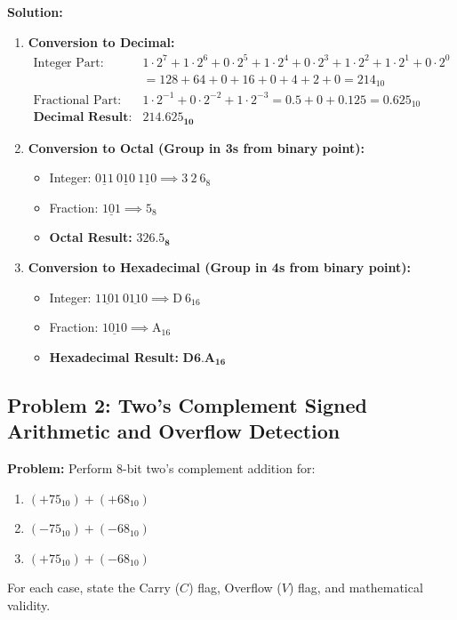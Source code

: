 \textbf{Solution:}
\begin{enumerate}[label=\bfseries\alph*.]
    \item \textbf{Conversion to Decimal:}
    \begin{align*}
    \text{Integer Part: } & 1\cdot 2^7 + 1\cdot 2^6 + 0\cdot 2^5 + 1\cdot 2^4 + 0\cdot 2^3 + 1\cdot 2^2 + 1\cdot 2^1 + 0\cdot 2^0 \\
    &= 128 + 64 + 0 + 16 + 0 + 4 + 2 + 0 = 214_{10} \\
    \text{Fractional Part: } & 1\cdot 2^{-1} + 0\cdot 2^{-2} + 1\cdot 2^{-3} = 0.5 + 0 + 0.125 = 0.625_{10} \\
    \textbf{Decimal Result: } & \mathbf{214.625_{10}}
    \end{align*}
    \item \textbf{Conversion to Octal (Group in 3s from binary point):}
    \begin{itemize}
        \item Integer: $\underline{011} \ \underline{010} \ \underline{110} \implies 3 \ 2 \ 6_8$
        \item Fraction: $\underline{101} \implies 5_8$
        \item \textbf{Octal Result:} $\mathbf{326.5_8}$
    \end{itemize}
    \item \textbf{Conversion to Hexadecimal (Group in 4s from binary point):}
    \begin{itemize}
        \item Integer: $\underline{1101} \ \underline{0110} \implies \text{D} \ 6_{16}$
        \item Fraction: $\underline{1010} \implies \text{A}_{16}$
        \item \textbf{Hexadecimal Result:} $\mathbf{D6.A_{16}}$
    \end{itemize}
\end{enumerate}

\subsection{Problem 2: Two's Complement Signed Arithmetic and Overflow Detection}
\textbf{Problem:} Perform 8-bit two's complement addition for:
\begin{enumerate}[label=\bfseries\alph*.]
    \item $(+75_{10}) + (+68_{10})$
    \item $(-75_{10}) + (-68_{10})$
    \item $(+75_{10}) + (-68_{10})$
\end{enumerate}
For each case, state the Carry ($C$) flag, Overflow ($V$) flag, and mathematical validity.


